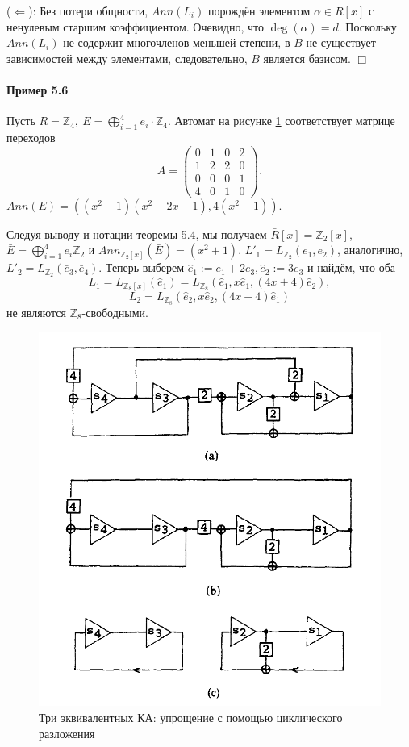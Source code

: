 \documentclass[a4paper,12pt]{article}
\newcommand{\hatei}[1]{\hat{e}_{#1}}
\begin{document}
($\Leftarrow$): Без потери общности, $Ann(L_i)$ порождён элементом $\alpha \in R[x]$ с ненулевым старшим коэффициентом. Очевидно, что $\deg(\alpha) = d$. Поскольку $Ann(L_i)$ не содержит многочленов меньшей степени, в $B$ не существует зависимостей между элементами, следовательно, $B$ является базисом. $\Box$


\paragraph{Пример 5.6}
Пусть $R = \mathbb{Z}_4, ~ E=\bigoplus_{i=1}^4 e_i \cdot \mathbb{Z}_4$. Автомат на рисунке \ref{fig5abc} соответствует матрице переходов $${ A =
	\begin{pmatrix}
		0 & 1 & 0 & 2\\
		1 & 2 & 2 & 0\\
		0 & 0 & 0 & 1\\
		4 & 0 & 1 & 0
\end{pmatrix}}.$$ $Ann(E) = ((x^2 - 1)(x^2 - 2x - 1), 4(x^2 - 1))$.

Следуя выводу и нотации теоремы 5.4, мы получаем $\bar{R}[x] = \mathbb{Z}_2 [x]$, $\bar{E} = \bigoplus_{i=1}^4 \bar{e}_i \mathbb{Z}_2$ и $Ann_{\mathbb{Z}_2[x]}(\bar{E}) = (x^2 + 1)$. $L'_1 = L_{\mathbb{Z}_2}(\bar{e}_1, \bar{e}_2)$, аналогично, $L'_2 = L_{\mathbb{Z}_2}(\bar{e}_3, \bar{e}_4)$. Теперь выберем $\hatei{1} := e_1 + 2e_3, \hatei{2} := 3e_3$ и найдём, что оба
$$ L_1 = L_{\mathbb{Z}_8[x]}(\hatei{1}) =  L_{\mathbb{Z}_8}(\hatei{1}, x \hatei{1}, (4x + 4) \hatei{2}), $$
$$ L_2 = L_{\mathbb{Z}_8}(\hatei{2}, x \hatei{2}, (4x + 4) \hatei{1})$$
не являются $\mathbb{Z}_8$-свободными.

\begin{figure}[h]
	\centering
	\includegraphics[width=0.7\linewidth]{pictures/fig5abc.png}
	\caption{Три эквивалентных КА: упрощение с помощью циклического разложения}
	\label{fig5abc}
\end{figure}
\end{document}
